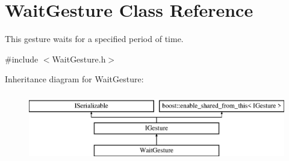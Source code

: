 \hypertarget{class_wait_gesture}{}\section{Wait\+Gesture Class Reference}
\label{class_wait_gesture}


This gesture waits for a specified period of time.  




{\ttfamily \#include $<$Wait\+Gesture.\+h$>$}

Inheritance diagram for Wait\+Gesture\+:\begin{figure}[H]
\begin{center}
\leavevmode
\includegraphics[height=3.000000cm]{class_wait_gesture}
\end{center}
\end{figure}

